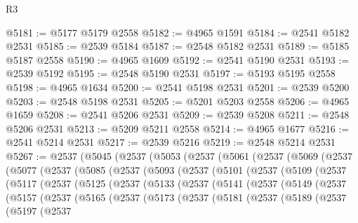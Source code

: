 \begin{lexlean}{R3}
\begin{coremodule}
@5181 := @5177 @5179 @2558
@5182 := @4965 @1591
@5184 := @2541 @5182 @2531
@5185 := @2539 @5184
@5187 := @2548 @5182 @2531
@5189 := @5185 @5187 @2558
@5190 := @4965 @1609
@5192 := @2541 @5190 @2531
@5193 := @2539 @5192
@5195 := @2548 @5190 @2531
@5197 := @5193 @5195 @2558
@5198 := @4965 @1634
@5200 := @2541 @5198 @2531
@5201 := @2539 @5200
@5203 := @2548 @5198 @2531
@5205 := @5201 @5203 @2558
@5206 := @4965 @1659
@5208 := @2541 @5206 @2531
@5209 := @2539 @5208
@5211 := @2548 @5206 @2531
@5213 := @5209 @5211 @2558
@5214 := @4965 @1677
@5216 := @2541 @5214 @2531
@5217 := @2539 @5216
@5219 := @2548 @5214 @2531
@5267 := @2537
    (@5045
      (@2537
        (@5053
          (@2537
            (@5061
              (@2537
                (@5069
                  (@2537
                    (@5077
                      (@2537
                        (@5085
                          (@2537
                            (@5093
                              (@2537
                                (@5101
                                  (@2537
                                    (@5109
                                      (@2537
                                        (@5117
                                          (@2537
                                            (@5125
                                              (@2537
                                                (@5133
                                                  (@2537
                                                    (@5141
                                                      (@2537
                                                        (@5149
                                                          (@2537
                                                            (@5157
                                                              (@2537
                                                                (@5165
                                                                  (@2537
                                                                    (@5173
                                                                      (@2537
                                                                        (@5181
                                                                          (@2537
                                                                            (@5189
                                                                              (@2537
                                                                                (@5197
                                                                                  (@2537

\end{coremodule}
\end{lexlean}
